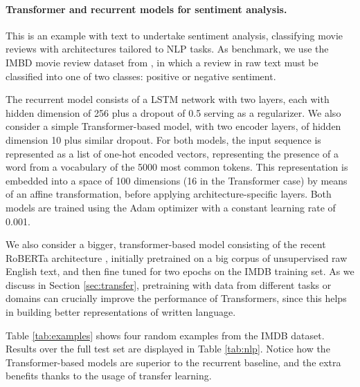 \paragraph{Transformer and recurrent models for sentiment analysis.}
This is an example with text to undertake sentiment analysis, classifying movie reviews with architectures tailored to NLP tasks. As benchmark, we use the IMBD movie review dataset 
from \cite{maas-EtAl:2011:ACL-HLT2011}, in which a review in raw text must be classified into one of two classes: positive or negative
sentiment. 

The recurrent model consists of a LSTM network with two layers, each with hidden dimension of 256 plus a dropout of 0.5 serving as a regularizer. We also consider a simple Transformer-based model, with two encoder layers, of hidden dimension 10 plus similar dropout. For both models, the input sequence is represented as a list of one-hot encoded vectors, representing the presence of a word from a vocabulary of the 5000 most common tokens. This representation is embedded into a space of 100 dimensions
(16 in the Transformer case) by means of an affine transformation, before applying architecture-specific layers. Both models are trained using the Adam optimizer with a constant learning rate of 0.001.

We also consider a bigger, transformer-based model consisting of the recent RoBERTa architecture \cite{liu2019roberta}, 
initially pretrained on a big corpus of unsupervised raw  English text, and then fine tuned for two epochs on the IMDB training set. As we 
 discuss in Section \ref{sec:transfer}, pretraining with data from different tasks or domains can crucially improve the performance of Transformers, since this helps in building better representations of written language.

Table \ref{tab:examples} shows four random examples from the IMDB dataset.
Results over the full test set are displayed in Table \ref{tab:nlp}. Notice how the Transformer-based models are superior to the recurrent baseline, and the extra benefits thanks to the usage of transfer learning.


